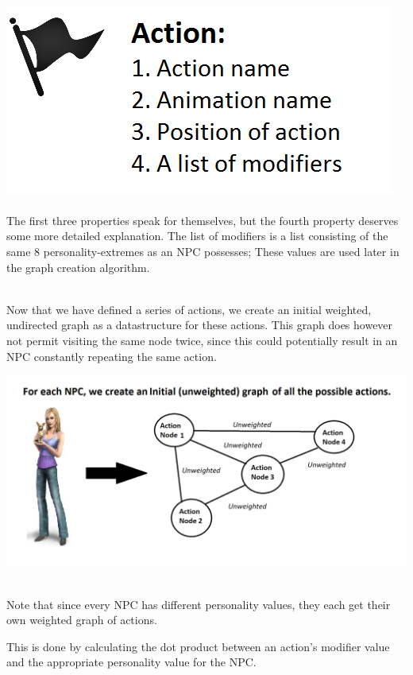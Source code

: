 \documentclass[11pt]{article} %
\begin{document}
~\\
\includegraphics[scale=0.7]{ActionFlag}
~\\

~\\
The first three properties speak for themselves, but the fourth property deserves some more detailed explanation. The list of modifiers is a list consisting of the same 8 personality-extremes as an NPC possesses; These values are used later in the graph creation algorithm.

~\\
Now that we have defined a series of actions, we create an initial weighted, undirected graph as a datastructure for these actions. This graph does however not permit visiting the same node twice, since this could potentially result in an NPC constantly repeating the same action. 

\includegraphics[scale=0.4]{InitialGraph}

~\\
Note that since every NPC has different personality values, they each get their own weighted graph of actions. 



\newpage
This is done by calculating the dot product between an action's modifier value and the appropriate personality value for the NPC. 
\end{document}

